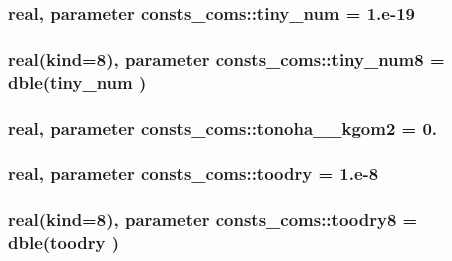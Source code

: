 \subsubsection[{\texorpdfstring{tiny\+\_\+num}{tiny_num}}]{\setlength{\rightskip}{0pt plus 5cm}real, parameter consts\+\_\+coms\+::tiny\+\_\+num = 1.e-\/19}\hypertarget{namespaceconsts__coms_a9dc9f1b4f076c19c09ba1adb961cddc3}{}\label{namespaceconsts__coms_a9dc9f1b4f076c19c09ba1adb961cddc3}
\subsubsection[{\texorpdfstring{tiny\+\_\+num8}{tiny_num8}}]{\setlength{\rightskip}{0pt plus 5cm}real(kind=8), parameter consts\+\_\+coms\+::tiny\+\_\+num8 = dble({\bf tiny\+\_\+num} )}\hypertarget{namespaceconsts__coms_a573c8ad925cab4a7c537ec6e2b20a7a3}{}\label{namespaceconsts__coms_a573c8ad925cab4a7c537ec6e2b20a7a3}
\subsubsection[{\texorpdfstring{tonoha\+\_\+2\+\_\+kgom2}{tonoha_2_kgom2}}]{\setlength{\rightskip}{0pt plus 5cm}real, parameter consts\+\_\+coms\+::tonoha\+\_\+\_\+kgom2 = 0.}\hypertarget{namespaceconsts__coms_aa7675ead7f9ba61cbdd5778d0cf09f95}{}\label{namespaceconsts__coms_aa7675ead7f9ba61cbdd5778d0cf09f95}
\subsubsection[{\texorpdfstring{toodry}{toodry}}]{\setlength{\rightskip}{0pt plus 5cm}real, parameter consts\+\_\+coms\+::toodry = 1.e-\/8}\hypertarget{namespaceconsts__coms_a363a55ffb8996335aa3e826419496dd6}{}\label{namespaceconsts__coms_a363a55ffb8996335aa3e826419496dd6}
\subsubsection[{\texorpdfstring{toodry8}{toodry8}}]{\setlength{\rightskip}{0pt plus 5cm}real(kind=8), parameter consts\+\_\+coms\+::toodry8 = dble({\bf toodry} )}\hypertarget{namespaceconsts__coms_a997a12f52740babd7a7fecce0c0d489b}{}\label{namespaceconsts__coms_a997a12f52740babd7a7fecce0c0d489b}
